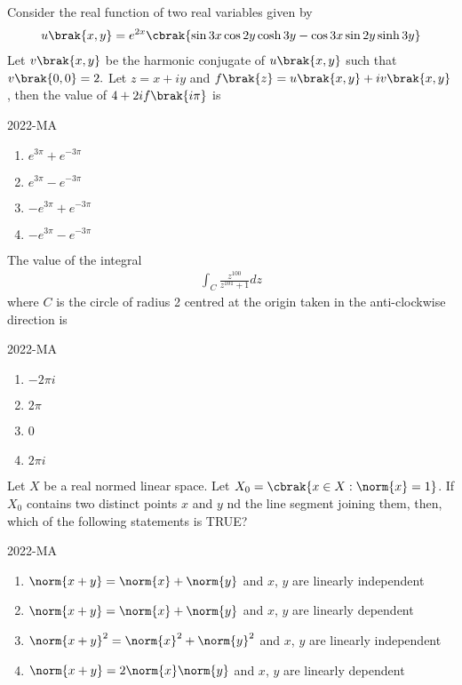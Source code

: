 \item Consider the real function of two real variables given by
	\begin{align*}
		u\brak{x,y}=e^{2x}\cbrak{\sin 3x \cos 2y \cosh 3y - \cos 3x \sin 2y \sinh 3y}
	\end{align*}
Let $v\brak{x,y}$ be the harmonic conjugate of $u\brak{x,y}$ such that $v\brak{0,0}=2.$ Let $z=x+iy$ and $f\brak{z}=u\brak{x,y}+iv\brak{x,y}$, then the value of $4+2if\brak{i \pi}$ is

		\hfill{2022-MA}

	\begin{enumerate}
		\item $e^{3 \pi}+e^{-3 \pi}$
		\item $e^{3 \pi}-e^{-3 \pi}$
		\item $-e^{3 \pi}+e^{-3 \pi}$
		\item $-e^{3 \pi}-e^{-3 \pi}$
	\end{enumerate}

\item The value of the integral 
	\begin{align*}
		\int_{C} \frac{z^{100}}{z^{101}+1} dz
	\end{align*}
	where $C$ is the circle of radius 2 centred at the origin taken in the anti-clockwise
direction is

		\hfill{2022-MA}

	\begin{enumerate}
		\item $-2 \pi i$
		\item $2 \pi$
		\item 0
		\item $2 \pi i$
	\end{enumerate}

\item Let $X$ be a real normed linear space. Let $X_0 = \cbrak{ x \in X: \norm{x}=1}$. If $X_0$ contains two distinct points $x$ and $y$ nd the line segment joining them, then, which of the following statements is TRUE?
	
	\hfill{2022-MA}

	\begin{enumerate}
		\item $\norm{x+y}=\norm{x}+\norm{y}$ and $x$, $y$ are linearly independent
		\item $\norm{x+y}=\norm{x}+\norm{y}$ and $x$, $y$ are linearly dependent
		\item $\norm{x+y}^{2}=\norm{x}^{2}+\norm{y}^{2}$ and $x$, $y$ are linearly independent
		\item $\norm{x+y}=2\norm{x} \norm{y}$ and $x$, $y$ are linearly dependent
	\end{enumerate}

